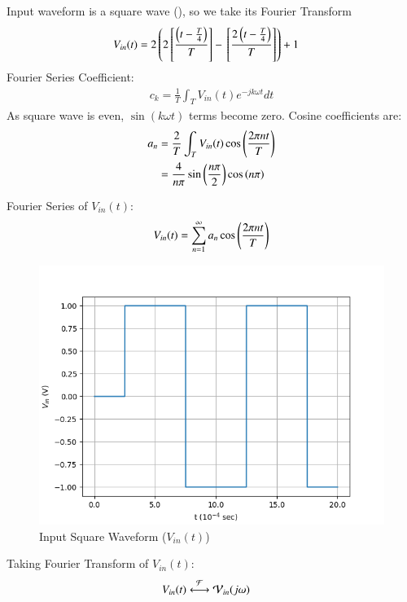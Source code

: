 \documentclass[journal,12pt,twocolumn]{IEEEtran}
\theoremstyle{remark}
\begin{document}
\solution


Input waveform is a square wave (), so we take its Fourier Transform 
\begin{align}
    V_{in}(t) &= 2\left(2{}\left[\frac{\left(t-\frac{T}{4}\right)}{T}\right] - {}\left[\frac{2\left(t - \frac{T}{4}\right)}{T}\right]\right) + 1
\end{align}
Fourier Series Coefficient:
\begin{align}
    c_k = \frac{1}{T} \int_{T} V_{in}(t)e^{-jk\omega t}dt
\end{align}
As square wave is even, $\sin(k\omega t)$ terms become zero. Cosine coefficients are:
\begin{align}
    a_n &= \frac{2}{T} \int_{T} V_{in}(t) \cos\left(\frac{2\pi nt}{T}\right)\\
    &= \frac{4}{n\pi}\sin{\ensuremath{\left(\frac{n\pi}{2}\right)}}\cos\left({n\pi}\right)
\end{align}

Fourier Series of $V_{in}(t)$:
\begin{align}
    V_{in}(t) = \sum_{n = 1}^{\infty}a_n \cos\left(\frac{2\pi nt}{T}\right)\label{eq:5_gate.23.ph.37}
\end{align}

\begin{figure}[!h]
    \centering
    \includegraphics[width = \columnwidth]{figs/square.png}
    \caption{Input Square Waveform ($V_{in}(t)$)}
    \label{fig:square_gate.ph.23.37}
\end{figure}

Taking Fourier Transform of $V_{in}(t)$:
\begin{align}
    V_{in}(t) &\system{F} \mathcal{V}_{in}(j\omega)
\end{align}
\end{document}
